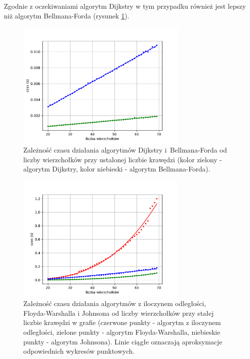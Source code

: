 \documentclass[12pt,a4paper]{book}
\theoremstyle{definition}
\numberwithin{equation}{chapter}
\begin{document}
Zgodnie z oczekiwaniami algorytm Dijkstry w tym przypadku również jest lepszy niż algorytm Bellmana-Forda (rysunek \ref{rys_wykres_kraw_dij_b_f}).

\begin{figure}[H]
\centering
\includegraphics[width=0.75\textwidth]{images/Wykres_stale_krawedzie_Dijkstra_Bellman_Ford.pdf}
\caption{Zależność czasu działania algorytmów Dijkstry i~Bellmana-Forda od liczby wierzchołków przy ustalonej liczbie krawędzi (kolor zielony - algorytm Dijkstry, kolor niebieski - algorytm Bellmana-Forda).}
\label{rys_wykres_kraw_dij_b_f}
\end{figure}

\begin{figure}[H]
\centering
\includegraphics[width=0.75\textwidth]{images/Wykres_stale_krawedzie_Matrix_Floyd_Warshall_Johnson.pdf}
\caption{Zależność czasu działania algorytmów z iloczynem odległości, Floyda-Warshalla i Johnsona od liczby wierzchołków przy stałej liczbie krawędzi w grafie (czerwone punkty - algorytm z iloczynem odległości, zielone punkty - algorytm Floyda-Warshalla, niebieskie punkty - algorytm Johnsona).  Linie ciągłe oznaczają aproksymacje odpowiednich wykresów punktowych.}
\label{rys_wykres_kraw_mm_fw_j}
\end{figure}
\end{document}
